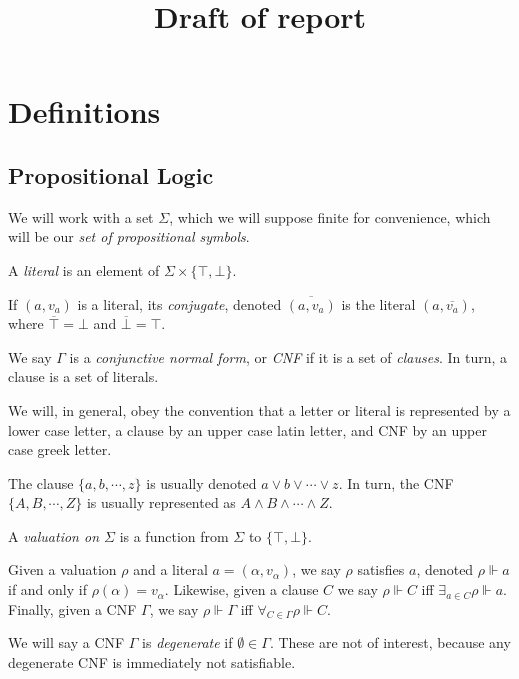\documentclass[11pt]{article}
\title{Draft of report}
\author{}
\date{}
\newcommand{\conj}[1]{\overline{#1}}
\newcommand{\sat}{\Vdash}
\begin{document}
\maketitle

\tableofcontents

\section{Definitions}

\subsection{Propositional Logic}

We will work with a set $\Sigma$, which we will suppose finite for convenience, which will be our \emph{set of propositional symbols}.

A \emph{literal} is an element of $\Sigma \times \{\top, \bot\}$.

If $(a, v_a)$ is a literal, its \emph{conjugate}, denoted $\conj{(a,v_a)}$ is the literal $(a, \conj{v_a})$, where $\conj \top = \bot$ and $\conj \bot = \top$.

We say $\Gamma$ is a \emph{conjunctive normal form}, or \emph{CNF} if it is a set of \emph{clauses}. In turn, a clause is a set of literals.

We will, in general, obey the convention that a letter or literal is represented by a lower case letter, a clause by an upper case latin letter, and CNF by an upper case greek letter.

The clause $\{a,b,\cdots,z\}$ is usually denoted $a \vee b \vee \cdots \vee z$. In turn, the CNF $\{A, B, \cdots, Z\}$ is usually represented as $A \wedge B \wedge \cdots \wedge Z$.

A \emph{valuation on $\Sigma$} is a function from $\Sigma$ to $\{\top, \bot\}$.

Given a valuation $\rho$ and a literal $a = (\alpha, v_\alpha)$, we say $\rho$ satisfies $a$, denoted $\rho \sat a$ if and only if $\rho(\alpha) = v_\alpha$. Likewise, given a clause $C$ we say $\rho \sat C$ iff $\exists_{a \in C} \rho \sat a$. Finally, given a CNF $\Gamma$, we say $\rho \sat \Gamma$ iff $\forall_{C \in \Gamma} \rho \sat C$.

We will say a CNF $\Gamma$ is \emph{degenerate} if $\emptyset \in \Gamma$. These are not of interest, because any degenerate CNF is immediately not satisfiable.
\end{document}
